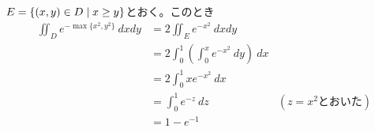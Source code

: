
\begin{sol}
  $E = \left\{ (x,y) \in D \mathrel{} \middle| \mathrel{} x \geq y \right\}$とおく。このとき
  \begin{align*}
    \iint_D e^{- \max \{ x^2,y^2 \} } \ dx dy &= 2 \iint_E e^{- x^2 } \ dx dy \\
    &= 2 \int_0^1 \left(  \int_0^x e^{-x^2} \ dy   \right) \ dx \\
    &= 2 \int_0^1 x e^{-x^2} \ dx \\
    &= \int_0^1 e^{-z} \ dz &(z = x^2 \text{とおいた}) \\
    &= 1 - e^{-1}
  \end{align*}
\end{sol}


\newpage


